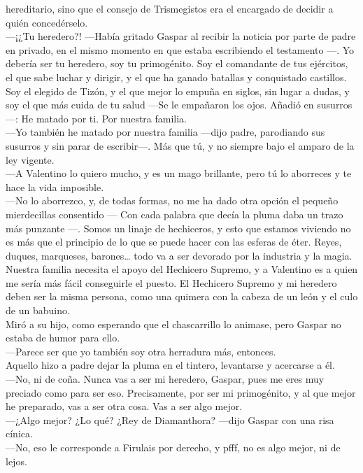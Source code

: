 \documentclass[
  letterpaper,
]{book}
\begin{document}
hereditario, sino que el consejo de Trismegistos era el encargado de
decidir a quién concedérselo.\\
---¡¿Tu heredero?! ---Había gritado Gaspar al recibir la noticia por
parte de padre en privado, en el mismo momento en que estaba escribiendo
el testamento ---. Yo debería ser tu heredero, soy tu primogénito. Soy
el comandante de tus ejércitos, el que sabe luchar y dirigir, y el que
ha ganado batallas y conquistado castillos. Soy el elegido de Tizón, y
el que mejor lo empuña en siglos, sin lugar a dudas, y soy el que más
cuida de tu salud ---Se le empañaron los ojos. Añadió en susurros ---:
He matado por ti. Por nuestra familia.\\
---Yo también he matado por nuestra familia ---dijo padre, parodiando
sus susurros y sin parar de escribir---. Más que tú, y no siempre bajo
el amparo de la ley vigente.\\
---A Valentino lo quiero mucho, y es un mago brillante, pero tú lo
aborreces y te hace la vida imposible.\\
---No lo aborrezco, y, de todas formas, no me ha dado otra opción el
pequeño mierdecillas consentido --- Con cada palabra que decía la pluma
daba un trazo más punzante ---. Somos un linaje de hechiceros, y esto
que estamos viviendo no es más que el principio de lo que se puede hacer
con las esferas de éter. Reyes, duques, marqueses, barones\ldots{} todo
va a ser devorado por la industria y la magia. Nuestra familia necesita
el apoyo del Hechicero Supremo, y a Valentino es a quien me sería más
fácil conseguirle el puesto. El Hechicero Supremo y mi heredero deben
ser la misma persona, como una quimera con la cabeza de un león y el
culo de un babuino.\\
Miró a su hijo, como esperando que el chascarrillo lo animase, pero
Gaspar no estaba de humor para ello.\\
---Parece ser que yo también soy otra herradura más, entonces.\\
Aquello hizo a padre dejar la pluma en el tintero, levantarse y
acercarse a él.\\
---No, ni de coña. Nunca vas a ser mi heredero, Gaspar, pues me eres muy
preciado como para ser eso. Precisamente, por ser mi primogénito, y al
que mejor he preparado, vas a ser otra cosa. Vas a ser algo mejor.\\
---¿Algo mejor? ¿Lo qué? ¿Rey de Diamanthora? ---dijo Gaspar con una
risa cínica.\\
---No, eso le corresponde a Firulais por derecho, y pfff, no es algo
mejor, ni de lejos.\\
\end{document}
